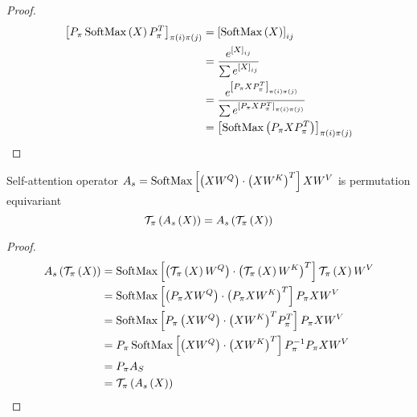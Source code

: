 \begin{proof}
	\begin{align*}
		{\left[P_{\pi}\operatorname{SoftMax}\left(X\right)P_{\pi}^T\right]}_{\pi(i)\pi(j)} & = {\left[\operatorname{SoftMax}\left(X\right)\right]}_{ij}                                                                           \\
		                                                                     & = \frac{e^{{\left[X\right]}_{ij}}}{\sum e^{{\left[X\right]}_{ij}}}                                                     \\
		                                                                     & = \frac{e^{{\left[P_{\pi}XP_{\pi}^T\right]}_{\pi(i)\pi(j)}}}{\sum e^{{\left[P_{\pi}XP_{\pi}^T\right]}_{\pi(i)\pi(j)}}} \\
		                                                                     & = {\left[\operatorname{SoftMax}\left(P_{\pi}XP_{\pi}^T\right)\right]}_{\pi(i)\pi(j)}
	\end{align*}
\end{proof}

\begin{theorem}
	Self-attention operator \(A_s = \operatorname{SoftMax}\left[\left(XW^Q\right)\cdot{\left(XW^K\right)}^T \right]XW^V\) is permutation equivariant
	\[\mathcal{T}_{\pi}\left(A_s\left(X\right)\right) = A_s\left(\mathcal{T}_{\pi}\left(X\right)\right)\]
\end{theorem}

\begin{proof}
	\begin{align*}
		A_s\left(\mathcal{T}_{\pi}\left(X\right)\right) & = \operatorname{SoftMax}\left[ \left( \mathcal{T}_{\pi}\left(X\right)W^Q\right) \cdot {\left(\ensuremath{\mathcal{T}_{\pi}}\left(X\right)W^K\right)}^T \right] \mathcal{T}_{\pi}\left(X\right)W^V \\
		                                     & = \operatorname{SoftMax}\left[ \left(P_{\pi}XW^Q\right)\cdot{\left(P_{\pi}XW^K\right)}^T  \right]P_{\pi}XW^V                                        \\
		                                     & = \operatorname{SoftMax}\left[ P_{\pi}\left(XW^Q\right)\cdot{\left(XW^K\right)}^T P_{\pi}^T  \right]P_{\pi}XW^V                                     \\
		                                     & = P_{\pi}\operatorname{SoftMax}\left[ \left(XW^Q\right)\cdot{\left(XW^K\right)}^T\right]P_{\pi}^{-1}P_{\pi}XW^V                                     \\
		                                     & = P_{\pi}A_S                                                                                                                          \\
		                                     & = \mathcal{T}_{\pi}\left(A_s\left(X\right)\right)
	\end{align*}
\end{proof}
